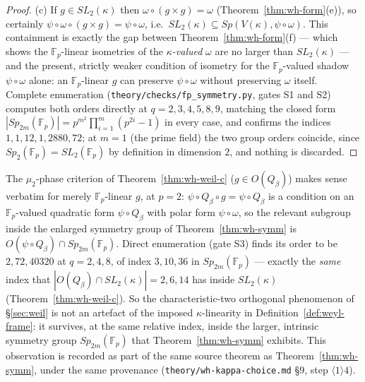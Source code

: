 \begin{proof}
(c) If $g\in SL_2(\kappa)$ then $\omega\circ(g\times g)=\omega$
(Theorem~\ref{thm:wh-form}(e)), so certainly
$\psi\circ\omega\circ(g\times g)=\psi\circ\omega$, i.e.\
$SL_2(\kappa)\subseteq Sp(V(\kappa),\psi\circ\omega)$. This containment is
exactly the gap between Theorem~\ref{thm:wh-form}(f) — which shows the
$\mathbb{F}_p$-linear isometries of the \emph{$\kappa$-valued} $\omega$ are
no larger than $SL_2(\kappa)$ — and the present, strictly weaker condition
of isometry for the $\mathbb{F}_p$-valued shadow $\psi\circ\omega$ alone: an
$\mathbb{F}_p$-linear $g$ can preserve $\psi\circ\omega$ without preserving
$\omega$ itself. Complete enumeration
(\texttt{theory\slash{}checks\slash{}fp\_symmetry.py}, gates S1 and S2) computes both
orders directly at $q=2,3,4,5,8,9$, matching the closed form
$|Sp_{2m}(\mathbb{F}_p)| = p^{m^2}\prod_{i=1}^m(p^{2i}-1)$ in every case,
and confirms the indices $1,1,12,1,2880,72$; at $m=1$ (the prime field) the
two group orders coincide, since $Sp_2(\mathbb{F}_p)=SL_2(\mathbb{F}_p)$ by
definition in dimension $2$, and nothing is discarded.
\end{proof}

\begin{remark}
The $\mu_2$-phase criterion of Theorem~\ref{thm:wh-weil-c}
($g\in O(Q_\beta)$) makes sense verbatim for merely $\mathbb{F}_p$-linear
$g$, at $p=2$: $\psi\circ Q_\beta\circ g=\psi\circ Q_\beta$ is a condition
on an $\mathbb{F}_p$-valued quadratic form $\psi\circ Q_\beta$ with polar
form $\psi\circ\omega$, so the relevant subgroup inside the enlarged
symmetry group of Theorem~\ref{thm:wh-symm} is
$O(\psi\circ Q_\beta) \cap Sp_{2m}(\mathbb{F}_p)$. Direct enumeration
(gate S3) finds its order to be $2,72,40320$ at $q=2,4,8$, of index
$3,10,36$ in $Sp_{2m}(\mathbb{F}_p)$ — exactly the \emph{same} index that
$|O(Q_\beta)\cap SL_2(\kappa)|=2,6,14$ has inside $SL_2(\kappa)$
(Theorem~\ref{thm:wh-weil-c}). So the characteristic-two orthogonal
phenomenon of \S\ref{sec:weil} is not an artefact of the imposed
$\kappa$-linearity in Definition~\ref{def:weyl-frame}: it survives, at the
same relative index, inside the larger, intrinsic symmetry group
$Sp_{2m}(\mathbb{F}_p)$ that Theorem~\ref{thm:wh-symm} exhibits. This
observation is recorded as part of the same source theorem as
Theorem~\ref{thm:wh-symm}, under the same provenance
(\texttt{theory\slash{}wh-kappa-choice.md} \S9, step $\langle1\rangle4$).
\end{remark}

